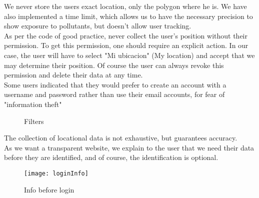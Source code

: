 We never store the users exact location, only the polygon where he is.
We have also implemented a time limit, which allows us to have the necessary precision to show exposure to pollutants, but doesn't allow user tracking.\\

As per the code of good practice, never collect the user's position without their permission.
To get this permission, one should require an explicit action. In our case, the user will have to select "Mi ubicacion" (My location) and accept 
that we may determine their position. Of course the user can always revoke this permission and
delete their data at any time. \\

Some users indicated that they would prefer to create an account with a username and password
rather than use their email accounts, for fear of "information theft"

\begin{figure}[ht]
    \centering
    \hfill
    \caption{Filters}
\end{figure}

The collection of locational data is not exhaustive, but guarantees accuracy. \\

As we want a transparent website, we explain to the user that we need their data before
they are identified, and of course, the identification is optional. \\

\begin{figure}[ht]
    \centering
    \texttt{[image: loginInfo]}
    \caption{Info before login}
\end{figure}